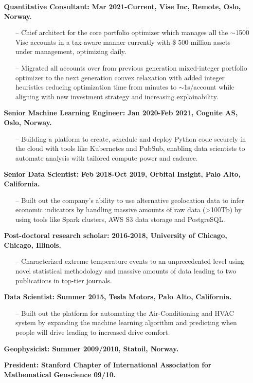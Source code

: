 \documentclass[letterpaper, 12pt]{article}
\renewenvironment{itemize}{
  \begin{list}{}{
    \setlength{\leftmargin}{1.5em}
  }
}{
  \end{list}
}
\begin{document}
\begin{itemize}
  \item \textbf{Quantitative Consultant: Mar 2021-Current, Vise Inc, Remote, Oslo, Norway. }
  \begin{enumerate}
       \item[--] Chief architect for the core portfolio optimizer which manages all the $\sim$1500 Vise accounts in a tax-aware manner currently with \$ 500 million assets under management, optimizing daily.
       \item[--] Migrated all accounts over from previous generation mixed-integer portfolio optimizer to the next generation convex relaxation with added integer heuristics reducing optimization time from minutes to $\sim$1s/account while aligning with new investment strategy and increasing explainability.
   \end{enumerate}
  
  \item \textbf{Senior Machine Learning Engineer: Jan 2020-Feb 2021, Cognite AS, Oslo, Norway. }
  \begin{enumerate}
       \item[--] Building a platform to create, schedule and deploy Python code securely in the cloud with tools like Kubernetes and PubSub, enabling data scientists to automate analysis with tailored compute power and cadence.
   \end{enumerate}
  \item \textbf{Senior Data Scientist: Feb 2018-Oct 2019, Orbital Insight, Palo Alto, California. }
  \begin{enumerate}
       \item[--] Built out the company's ability to use alternative geolocation data to infer economic indicators by handling massive amounts of raw data (>100Tb) by using tools like Spark clusters, AWS S3 data storage and PostgreSQL.
   \end{enumerate}
  \newpage
  \item \textbf{Post-doctoral research scholar: 2016-2018, University of Chicago, Chicago, Illinois.}
  \begin{enumerate}
       \item[--] Characterized extreme temperature events to an unprecedented level using novel statistical methodology and massive amounts of data leading to two publications in top-tier journals. 
   \end{enumerate}
  \item \textbf{Data Scientist: Summer 2015, Tesla Motors, Palo Alto, California.}
  \begin{enumerate}
       \item[--] Built out the platform for automating the Air-Conditioning and HVAC system by expanding the machine learning algorithm and predicting when people will drive leading to increased drive comfort.
   \end{enumerate}
  \item \textbf{Geophysicist: Summer 2009/2010, Statoil, Norway.}
  \item \textbf{President: Stanford Chapter of International Association
          for Mathematical Geoscience 09/10.}
\end{itemize}
\end{document}
